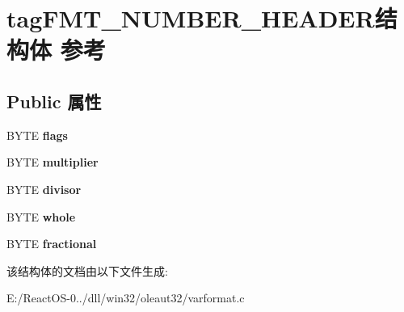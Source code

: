 \hypertarget{structtag_f_m_t___n_u_m_b_e_r___h_e_a_d_e_r}{}\section{tag\+F\+M\+T\+\_\+\+N\+U\+M\+B\+E\+R\+\_\+\+H\+E\+A\+D\+E\+R结构体 参考}
\label{structtag_f_m_t___n_u_m_b_e_r___h_e_a_d_e_r}
\subsection*{Public 属性}
\begin{DoxyCompactItemize}
\item 
\mbox{\label{structtag_f_m_t___n_u_m_b_e_r___h_e_a_d_e_r_a12fd73468d030fecb4b01b84716b8c36}} 
B\+Y\+TE {\bfseries flags}
\item 
\mbox{\label{structtag_f_m_t___n_u_m_b_e_r___h_e_a_d_e_r_a40f91ba3b0255274d212204c89f4ba07}} 
B\+Y\+TE {\bfseries multiplier}
\item 
\mbox{\label{structtag_f_m_t___n_u_m_b_e_r___h_e_a_d_e_r_a39e149c39b6bf8222c57855419ddd0c4}} 
B\+Y\+TE {\bfseries divisor}
\item 
\mbox{\label{structtag_f_m_t___n_u_m_b_e_r___h_e_a_d_e_r_a97f2d0843e3900e048d50d7f5c19b634}} 
B\+Y\+TE {\bfseries whole}
\item 
\mbox{\label{structtag_f_m_t___n_u_m_b_e_r___h_e_a_d_e_r_a6f22d07301a2001ebc763e7fc14e5ce7}} 
B\+Y\+TE {\bfseries fractional}
\end{DoxyCompactItemize}


该结构体的文档由以下文件生成\+:\begin{DoxyCompactItemize}
\item 
E\+:/\+React\+O\+S-\/0../dll/win32/oleaut32/varformat.\+c\end{DoxyCompactItemize}
